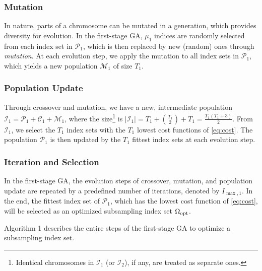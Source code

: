 \documentclass[journal]{IEEEtran}
\newcommand{\mC}{\mathcal{C}}
\newcommand{\mI}{\mathcal{I}}
\newcommand{\mM}{\mathcal{M}}
\newcommand{\mP}{\mathcal{P}}
\newcommand{\mS}{\mathcal{S}}
\numberwithin{const2}{const}
\begin{document}
\subsubsection{Mutation}
In nature,
parts of a chromosome can be mutated in a generation,
which provides diversity for evolution.
In the first-stage GA, %
$\mu_1$ indices are randomly selected from each index set %
in $\mP_1$,
which is then replaced by new (random) ones through \emph{mutation}.
At each evolution step, 
we apply the mutation to all index sets in $\mP_1$, %
which yields a new population $\mM_1$ of size $T_1$.

\subsubsection{Population Update}
Through crossover and mutation,
we have a new, intermediate population $\mI_1 = \mP_1 + \mC_1 + \mM_1$,
where the size\footnote{%
Identical chromosomes in $\mI_1$ (or $\mI_2$), if any, are treated as separate ones.} 
is $ |\mI_1| = T_1 + \binom{T_1}{2} + T_1 =  \frac{T_1(T_1+3)}{2}$.
From $\mI_1$, we select the $T_1$ index sets %
with the $T_1$ lowest cost functions of \eqref{eq:cost}.
The population $\mP_1$ is then updated by the $T_1$ fittest index sets
at each evolution step. 

\subsubsection{Iteration and Selection}
In the first-stage GA, 
the evolution steps of crossover, mutation, and population update
are repeated by a predefined number of iterations, denoted by $I_{\max, 1}$.
In the end, the fittest index set of $\mP_1$, which has the lowest cost function of \eqref{eq:cost},
will be selected as an optimized subsampling index set $\Omega_{\rm opt}$. 
 
Algorithm 1 describes the entire steps of the first-stage GA
to optimize a subsampling index set. %
\end{document}
